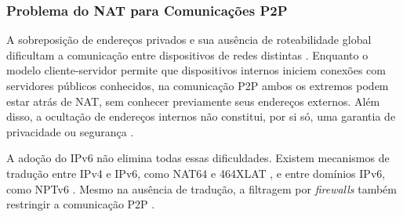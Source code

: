 \subsubsection{Problema do NAT para Comunicações P2P}
\label{sec:nat_problem_for_p2p_communication}

A sobreposição de endereços privados e sua ausência de roteabilidade global dificultam a comunicação entre dispositivos de redes distintas \citep{RFC1631, ford2005peer}. Enquanto o modelo cliente-servidor permite que dispositivos internos iniciem conexões com servidores públicos conhecidos, na comunicação P2P ambos os extremos podem estar atrás de NAT, sem conhecer previamente seus endereços externos. Além disso, a ocultação de endereços internos não constitui, por si só, uma garantia de privacidade ou segurança \citep{rfc5128, RFC4941}.

A adoção do IPv6 não elimina todas essas dificuldades. Existem mecanismos de tradução entre IPv4 e IPv6, como NAT64 e 464XLAT \citep{rfc6146, rfc6877}, e entre domínios IPv6, como NPTv6 \citep{rfc6296}. Mesmo na ausência de tradução, a filtragem por \textit{firewalls} também restringir a comunicação P2P \citep{rfc5128}.


